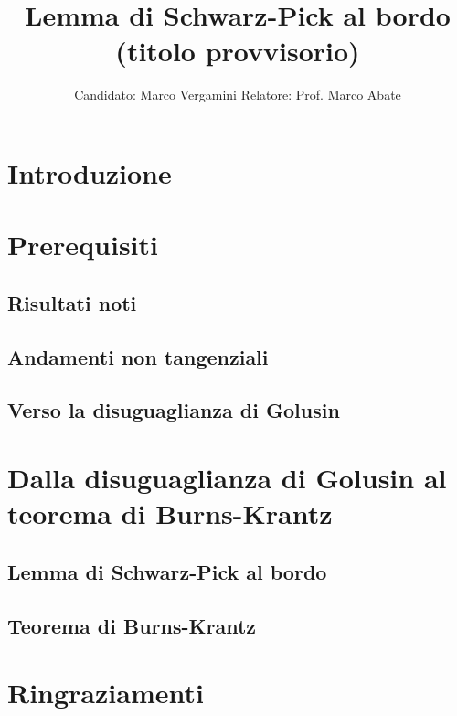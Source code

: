 \documentclass{article}
\title{Lemma di Schwarz-Pick al bordo (titolo provvisorio)}
\date{}
\author{Candidato: Marco Vergamini \qquad Relatore: Prof. Marco Abate}
\begin{document}
\maketitle
\newpage
\tableofcontents
\newpage


\section*{Introduzione}


\newpage

\section{Prerequisiti}

\subsection{Risultati noti}


\subsection{Andamenti non tangenziali}


\subsection{Verso la disuguaglianza di Golusin}


\newpage

\section{Dalla disuguaglianza di Golusin al teorema di Burns-Krantz}

\subsection{Lemma di Schwarz-Pick al bordo}


\subsection{Teorema di Burns-Krantz}


\newpage



\section*{Ringraziamenti}

\end{document}
